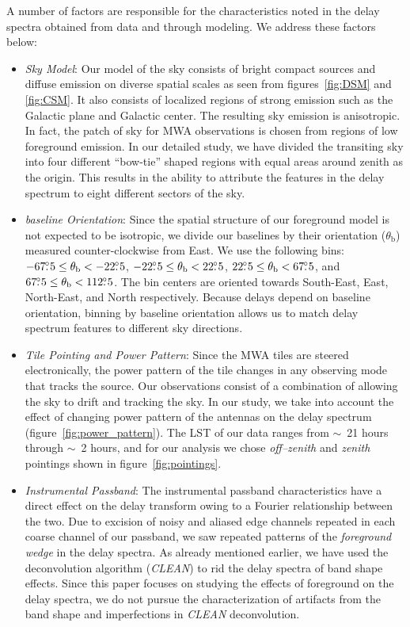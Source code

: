 \documentclass[preprint2,iop,numberedappendix]{emulateapj}
\begin{document}
A number of factors are responsible for the characteristics noted in the delay spectra obtained from data and through modeling. We address these factors below:
\begin{itemize}

\item {\it Sky Model}: Our model of the sky consists of bright compact sources and diffuse emission on diverse spatial scales as seen from figures~\ref{fig:DSM} and \ref{fig:CSM}. It also consists of localized regions of strong emission such as the Galactic plane and Galactic center. The resulting sky emission is anisotropic. In fact, the patch of sky for MWA observations is chosen from regions of low foreground emission. In our detailed study, we have divided the transiting sky into four different ``bow-tie'' shaped regions with equal areas around zenith as the origin. This results in the ability to attribute the features in the delay spectrum to eight different sectors of the sky. 

\item {\it baseline Orientation}: Since the spatial structure of our foreground model is not expected to be isotropic, we divide our baselines by their orientation ($\theta_\textrm{b}$) measured counter-clockwise from East. We use the following bins: $-67\mbox{$.\!\!^\circ$} 5\le \theta_\textrm{b} < -22\mbox{$.\!\!^\circ$} 5$, $-22\mbox{$.\!\!^\circ$} 5\le \theta_\textrm{b} < 22\mbox{$.\!\!^\circ$} 5$, $22\mbox{$.\!\!^\circ$} 5\le \theta_\textrm{b} < 67\mbox{$.\!\!^\circ$} 5$, and $67\mbox{$.\!\!^\circ$} 5\le \theta_\textrm{b} < 112\mbox{$.\!\!^\circ$} 5$. The bin centers are oriented towards South-East, East, North-East, and North respectively. Because delays depend on baseline orientation, binning by baseline orientation allows us to match delay spectrum features to different sky directions.

\item {\it Tile Pointing and Power Pattern}: Since the MWA tiles are steered electronically, the power pattern of the tile changes in any observing mode that tracks the source. Our observations consist of a combination of allowing the sky to drift and tracking the sky. In our study, we take into account the effect of changing power pattern of the antennas on the delay spectrum (figure~\ref{fig:power_pattern}). The LST of our data ranges from $\sim$~21 hours through $\sim$~2 hours, and for our analysis we chose {\it off--zenith} and {\it zenith} pointings shown in figure~\ref{fig:pointings}. 

\item {\it Instrumental Passband}: The instrumental passband characteristics have a direct effect on the delay transform owing to a Fourier relationship between the two. Due to excision of noisy and aliased edge channels repeated in each coarse channel of our passband, we saw repeated patterns of the {\it foreground wedge} in the delay spectra. As already mentioned earlier, we have used the deconvolution algorithm ({\it CLEAN}) to rid the delay spectra of band shape effects. Since this paper focuses on studying the effects of foreground on the delay spectra, we do not pursue the characterization of artifacts from the band shape and imperfections in {\it CLEAN} deconvolution.

\end{itemize}
\end{document}
